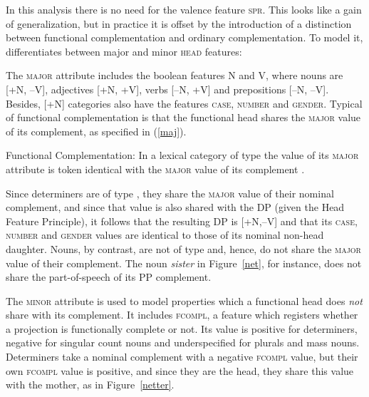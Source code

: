\documentclass[output=paper
	        ,collection
	        ,collectionchapter
 	        ,biblatex
                ,babelshorthands
                ,newtxmath
                ,draftmode
                ,colorlinks, citecolor=brown
]{langscibook}
\begin{document}
In this analysis there is no need for the valence feature \textsc{spr}.  
This looks like a gain of generalization, but in practice it is offset by the 
introduction of a distinction between functional 
complementation and ordinary complementation. To model it, \citet[307--308]{Netter94} differentiates 
between major and minor \textsc{head} features: 

\begin{exe} 
\ex    {} 
\end{exe} 

\noindent
The \textsc{major} attribute includes the boolean features N and V, where 
nouns are [+N, --V], adjectives [+N, +V], verbs [--N, +V] and prepositions [--N, --V]. 
Besides, [+N] categories also have the features \textsc{case}, \textsc{number} and \textsc{gender}. 
Typical of functional complementation is that the functional head shares the 
\textsc{major} value of its complement, as specified in (\ref{maj}). 

\begin{exe} 
\ex\label{maj} Functional Complementation: In a lexical category of type  the value of its \textsc{major} 
      attribute is token identical with the \textsc{major} value of its complement \citep[311--312]{Netter94}.  
\end{exe} 

\noindent
Since determiners are of type , they share the \textsc{major} value of their 
nominal complement, and since that value is 
also shared with the DP (given the Head Feature Principle), it follows that the resulting 
DP is [+N,--V] and that its \textsc{case}, \textsc{number} and \textsc{gender} values are 
identical to those of its nominal non-head daughter. 
Nouns, by contrast, are not of type  and, hence, do not share the 
\textsc{major} value of their complement. The noun \emph{sister} 
in Figure~\ref{net}, for instance, does not share the part-of-speech of its PP complement. 

The \textsc{minor} attribute is used to model properties which a functional head 
does {\em not} share with its complement. It includes \textsc{fcompl}, a feature which 
registers whether a projection is functionally complete or not. Its value is positive for 
determiners, negative for singular count nouns and underspecified for plurals and mass nouns.  
Determiners take a nominal complement with a negative \textsc{fcompl} value, but their 
own \textsc{fcompl} value is positive, and since they are the head, they share this value with 
the mother, as in Figure~\ref{netter}. 
\end{document}
